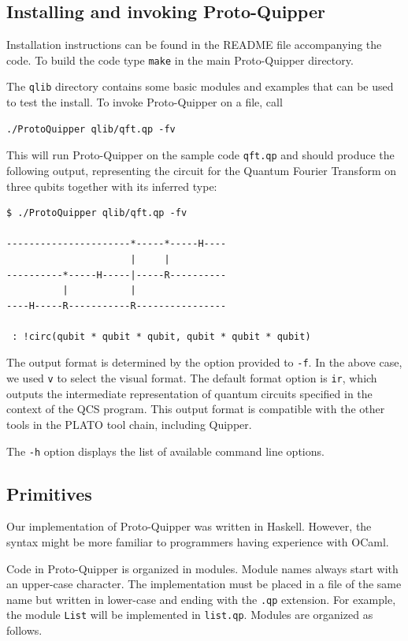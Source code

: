 \subsection{Installing and invoking Proto-Quipper}

Installation instructions can be found in the README file accompanying the code. 
To build the code type \verb#make# in the main Proto-Quipper directory. 

The \verb#qlib# directory contains some basic modules and examples that can 
be used to test the install. To invoke Proto-Quipper on a file, call 
\begin{verbatim}
./ProtoQuipper qlib/qft.qp -fv
\end{verbatim}
This will run Proto-Quipper on the sample code \verb#qft.qp# and should produce the following output, representing the circuit for the 
Quantum Fourier Transform on three qubits together with its inferred 
type:
\begin{verbatim}
$ ./ProtoQuipper qlib/qft.qp -fv

----------------------*-----*-----H----
                      |     |          
----------*-----H-----|-----R----------
          |           |                
----H-----R-----------R----------------

 : !circ(qubit * qubit * qubit, qubit * qubit * qubit)
\end{verbatim}
The output format is determined by the option provided to \verb#-f#. In the above case, we used \verb#v# to select the visual format. The default format option is \verb#ir#, which outputs the intermediate representation of quantum circuits specified in the context of the QCS program. This output format is compatible with the other tools in the PLATO tool chain, including Quipper.

The \verb#-h# option displays the list of available command line options. 

\subsection{Primitives}

Our implementation of Proto-Quipper was written in Haskell. However, the 
syntax might be more familiar to programmers having experience with OCaml.

Code in Proto-Quipper is organized in modules. Module names always start 
with an upper-case character. The implementation must be placed in a file 
of the same name but written in lower-case and ending with the {\tt.qp} 
extension. For example, the module {\tt List} will be implemented in 
{\tt list.qp}. Modules are organized as follows.


